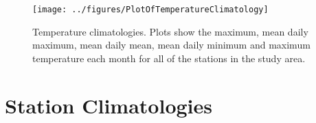 \documentclass[report]{nrel}
\begin{document}
\begin{figure}[!ht]
\centering
\texttt{[image: ../figures/PlotOfTemperatureClimatology]}
\caption{Temperature climatologies. Plots show the maximum, mean daily maximum, mean daily mean, mean daily minimum and maximum temperature each month for all of the stations in the study area.}
\end{figure}


\appendix
\chapter{Station Climatologies}
\clearpage

\end{document}

